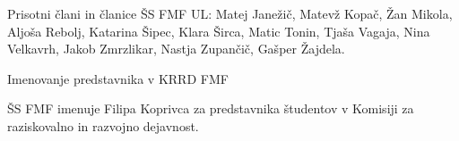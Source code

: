 \documentclass{seja}
\begin{document}
Prisotni člani in članice ŠS FMF UL:
Matej Janežič, Matevž Kopač, Žan Mikola, Aljoša Rebolj, Katarina Šipec, Klara Širca, Matic Tonin, Tjaša Vagaja, Nina Velkavrh, Jakob Zmrzlikar, Nastja Zupančič, Gašper Žajdela.

\begin{red}
    \item
    Imenovanje predstavnika v KRRD FMF
\end{red}

\begin{ad}
    \item
    \begin{sklep*}
       ŠS FMF imenuje Filipa Koprivca za predstavnika študentov v Komisiji za raziskovalno in razvojno dejavnost.
    \end{sklep*}
   
\end{ad}
\makeatletter \global\let\@enddocumenthook\@empty \makeatother
{}
\end{document}
